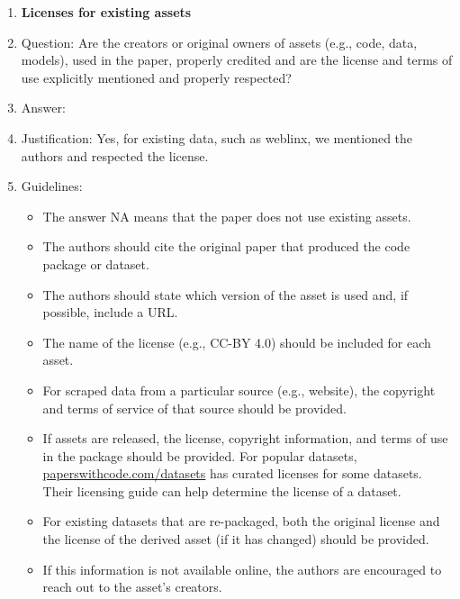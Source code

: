 \documentclass{article}
\begin{document}
\begin{enumerate}
\item {\bf Licenses for existing assets}
    \item[] Question: Are the creators or original owners of assets (e.g., code, data, models), used in the paper, properly credited and are the license and terms of use explicitly mentioned and properly respected?
    \item[] Answer: \answerYes{} %
    \item[] Justification: Yes, for existing data, such as weblinx, we mentioned the authors and respected the license.
    \item[] Guidelines:
    \begin{itemize}
        \item The answer NA means that the paper does not use existing assets.
        \item The authors should cite the original paper that produced the code package or dataset.
        \item The authors should state which version of the asset is used and, if possible, include a URL.
        \item The name of the license (e.g., CC-BY 4.0) should be included for each asset.
        \item For scraped data from a particular source (e.g., website), the copyright and terms of service of that source should be provided.
        \item If assets are released, the license, copyright information, and terms of use in the package should be provided. For popular datasets, \url{paperswithcode.com/datasets} has curated licenses for some datasets. Their licensing guide can help determine the license of a dataset.
        \item For existing datasets that are re-packaged, both the original license and the license of the derived asset (if it has changed) should be provided.
        \item If this information is not available online, the authors are encouraged to reach out to the asset's creators.
    \end{itemize}


\end{enumerate}
\end{document}
